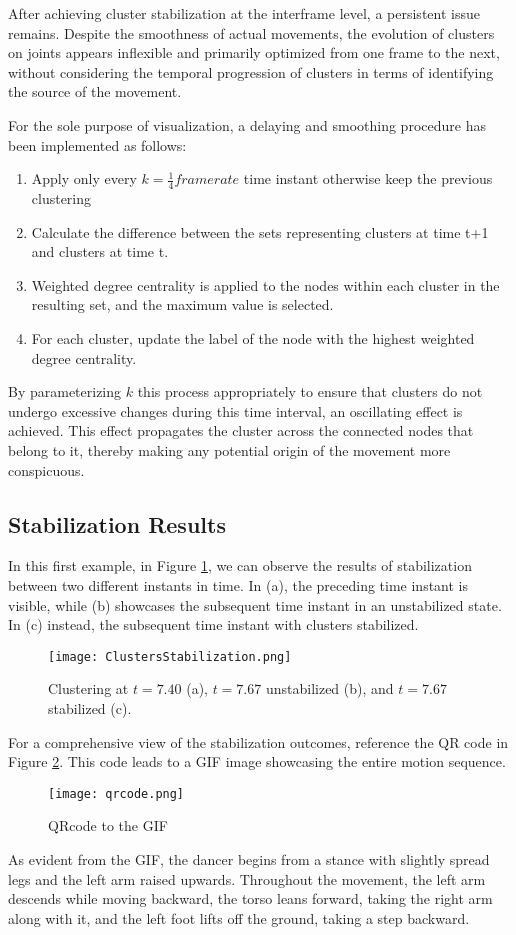 After achieving cluster stabilization at the interframe level, a persistent issue remains. 
Despite the smoothness of actual movements, the evolution of clusters on joints appears inflexible 
and primarily optimized from one frame to the next, 
without considering the temporal progression of clusters in terms of identifying the source of the movement.

For the sole purpose of visualization, a delaying and smoothing procedure has been implemented as follows:
\begin{enumerate}
  \item Apply only every $k = \frac{1}{4}framerate$ time instant otherwise keep the previous clustering
  \item Calculate the difference between the sets representing clusters at time t+1 and clusters at time t.
  \item Weighted degree centrality is applied to the nodes within each cluster in the resulting set, and the maximum value is selected.
  \item For each cluster, update the label of the node with the highest weighted degree centrality.
\end{enumerate}

By parameterizing $k$ this process appropriately to ensure that clusters do not undergo excessive changes during this time interval, an oscillating effect is achieved. 
This effect propagates the cluster across the connected nodes that belong to it, thereby making any potential origin of the movement more conspicuous.

\subsection{Stabilization Results}
In this first example, in Figure \ref{fig:stabilization_results}, we can observe the results of stabilization between two different instants in time. 
In (a), the preceding time instant is visible, while (b) showcases the subsequent time instant in an unstabilized state. 
In (c) instead, the subsequent time instant with clusters stabilized.

\begin{figure}[H]
  \centering
  \texttt{[image: ClustersStabilization.png]}
  \caption{Clustering at $t=7.40$ (a), $t=7.67$ unstabilized (b), and $t=7.67$ stabilized (c).}
  \label{fig:stabilization_results}
\end{figure}

For a comprehensive view of the stabilization outcomes, reference the QR code in Figure \ref{fig:QRcode}. 
This code leads to a GIF image showcasing the entire motion sequence.

\begin{figure}[H]
  \centering
  \texttt{[image: qrcode.png]}
  \caption{QRcode to the GIF}
  \label{fig:QRcode}
\end{figure}

As evident from the GIF, the dancer begins from a stance with slightly spread legs and the left arm raised upwards.
Throughout the movement, the left arm descends while moving backward, the torso leans forward, taking the right arm along with it, and the left foot lifts off the ground, taking a step backward.